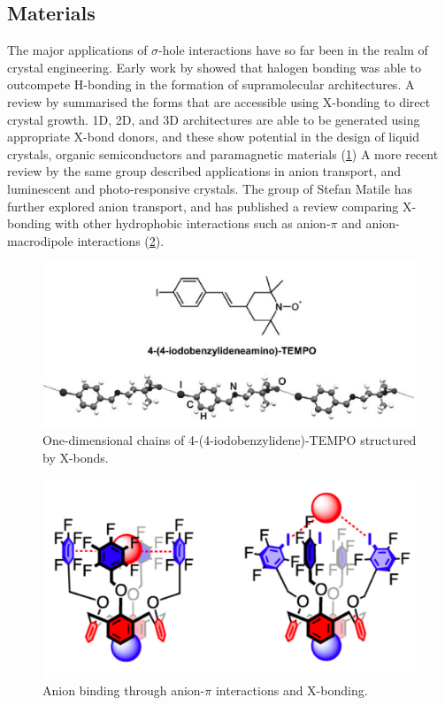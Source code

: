 \begin{refsection}
\subsection{Materials}
The major applications of $ \sigma $-hole interactions have so far been in the realm of crystal engineering.
Early work by \citeauthor{Corradi2000} showed that halogen bonding was able to outcompete H-bonding in the formation of supramolecular architectures.\autocite{Corradi2000}
A review by \citeauthor{Metrangolo2008} summarised the forms that are accessible using X-bonding to direct crystal growth.\autocite{Metrangolo2008}
1D, 2D, and 3D architectures are able to be generated using appropriate X-bond donors, and these show potential in the design of liquid crystals, organic semiconductors and paramagnetic materials (\cref{fig:iodotempo-chains})
A more recent review by the same group described applications in anion transport, and luminescent and photo-responsive crystals.\autocite{Priimagi2013}
The group of Stefan Matile has further explored anion transport, and has published a review comparing X-bonding with other hydrophobic interactions such as anion-$ \pi $ and anion-macrodipole interactions (\cref{fig:matile-anion-binder}).\autocite{VargasJentzsch2013}

\begin{figure}
    \centering
    \includegraphics[width=0.6\linewidth]{Figures/iodotempo-chains.pdf}
    \caption[One-dimensional chains of 4-(4-iodobenzylidene)-TEMPO structured by X-bonds.]{One-dimensional chains of 4-(4-iodobenzylidene)-TEMPO structured by X-bonds.\autocite{Metrangolo2008}}\label{fig:iodotempo-chains}
\end{figure}

\begin{figure}
    \centering
    \includegraphics[width=0.4\linewidth]{Figures/matile-anion-binder.pdf}
    \caption[Anion binding through anion-$ \pi $ interactions and X-bonding.]{Anion binding through anion-$ \pi $ interactions and X-bonding.\autocite{VargasJentzsch2013}}\label{fig:matile-anion-binder}
\end{figure}


\end{refsection}
